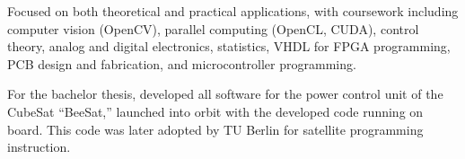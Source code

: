 \documentclass[8pt]{mofiicv}
\begin{document}
\begin{minipage}[T]{\SecondColumnWidth}
\begin{entrylist}
{			Focused on both theoretical and practical applications, with coursework including computer vision (OpenCV), parallel computing (OpenCL, CUDA), control theory, analog and digital electronics, statistics, VHDL for FPGA programming, PCB design and fabrication, and microcontroller programming.

			For the bachelor thesis, developed all software for the power control unit of the CubeSat “BeeSat,” launched into orbit with the developed code running on board. This code was later adopted by TU Berlin for satellite programming instruction.}
	\end{entrylist}
	\end{minipage}
	
\end{document}
